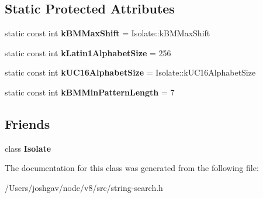 \subsection*{Static Protected Attributes}
\begin{DoxyCompactItemize}
\item 
static const int {\bfseries k\+B\+M\+Max\+Shift} = Isolate\+::k\+B\+M\+Max\+Shift\hypertarget{classv8_1_1internal_1_1_string_search_base_ad471d0ad669c9cdabae5866875a9ecaa}{}\label{classv8_1_1internal_1_1_string_search_base_ad471d0ad669c9cdabae5866875a9ecaa}

\item 
static const int {\bfseries k\+Latin1\+Alphabet\+Size} = 256\hypertarget{classv8_1_1internal_1_1_string_search_base_a1d21eb5372b2cb6a03cafe43844c9bb6}{}\label{classv8_1_1internal_1_1_string_search_base_a1d21eb5372b2cb6a03cafe43844c9bb6}

\item 
static const int {\bfseries k\+U\+C16\+Alphabet\+Size} = Isolate\+::k\+U\+C16\+Alphabet\+Size\hypertarget{classv8_1_1internal_1_1_string_search_base_a6c6e53551e567bd63a758f1450515272}{}\label{classv8_1_1internal_1_1_string_search_base_a6c6e53551e567bd63a758f1450515272}

\item 
static const int {\bfseries k\+B\+M\+Min\+Pattern\+Length} = 7\hypertarget{classv8_1_1internal_1_1_string_search_base_a92b11d18d2e45bda7dd25674c58369b0}{}\label{classv8_1_1internal_1_1_string_search_base_a92b11d18d2e45bda7dd25674c58369b0}

\end{DoxyCompactItemize}
\subsection*{Friends}
\begin{DoxyCompactItemize}
\item 
class {\bfseries Isolate}\hypertarget{classv8_1_1internal_1_1_string_search_base_aba4f0964bdacf2bbf62cf876e5d28d0a}{}\label{classv8_1_1internal_1_1_string_search_base_aba4f0964bdacf2bbf62cf876e5d28d0a}

\end{DoxyCompactItemize}


The documentation for this class was generated from the following file\+:\begin{DoxyCompactItemize}
\item 
/\+Users/joshgav/node/v8/src/string-\/search.\+h\end{DoxyCompactItemize}
